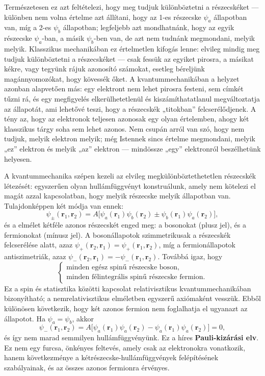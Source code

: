 \documentclass[../main.tex]{subfiles}
\begin{document}
Természetesen ez azt feltételezi, hogy meg tudjuk különböztetni a részecskéket — különben nem volna értelme azt állítani, hogy az 1-es részecske $\psi_a$ állapotban van, míg a 2-es $\psi_b$ állapotban; legfeljebb azt mondhatnánk, hogy az egyik részecske $\psi_a$-ban, a másik $\psi_b$-ben van, de azt nem tudnánk megmondani, melyik melyik. Klasszikus mechanikában ez értelmetlen kifogás lenne: elvileg mindig meg tudjuk különböztetni a részecskéket — csak fessük az egyiket pirosra, a másikat kékre, vagy tegyünk rájuk azonosító számokat, esetleg béreljünk magánnyomozókat, hogy kövessék őket. A kvantummechanikában a helyzet azonban alapvetően más: egy elektront nem lehet pirosra festeni, sem címkét tűzni rá, és egy megfigyelés elkerülhetetlenül és kiszámíthatatlanul megváltoztatja az állapotát, ami lehetővé teszi, hogy a részecskék „titokban” felcserélődjenek. A tény az, hogy az elektronok teljesen azonosak egy olyan értelemben, ahogy két klasszikus tárgy soha sem lehet azonos. Nem csupán arról van szó, hogy nem tudjuk, melyik elektron melyik; még Istennek sincs értelme megmondani, melyik „ez” elektron és melyik „az” elektron — mindössze „egy” elektronról beszélhetünk helyesen.

A kvantummechanika szépen kezeli az elvileg megkülönböztethetetlen részecskék létezését: egyszerűen olyan hullámfüggvényt konstruálunk, amely nem kötelezi el magát azzal kapcsolatban, hogy melyik részecske melyik állapotban van. Tulajdonképpen két módja van ennek:
\begin{equation}
\psi_{\pm}(\mathbf{r}_1,\mathbf{r}_2) = A\big[\psi_a(\mathbf{r}_1)\psi_b(\mathbf{r}_2)\pm\psi_b(\mathbf{r}_1)\psi_a(\mathbf{r}_2)\big],
\tag{5.17}
\end{equation}
és a elmélet kétféle azonos részecskét enged meg: a bosonokat (plusz jel), és a fermionokat (mínusz jel). A bosonállapotok szimmetrikusak a részecskék felcserélése alatt, azaz $\psi_+(\mathbf{r}_2,\mathbf{r}_1)=\psi_+(\mathbf{r}_1,\mathbf{r}_2)$, míg a fermionállapotok antiszimetriák, azaz $\psi_-(\mathbf{r}_2,\mathbf{r}_1)=-\psi_-(\mathbf{r}_1,\mathbf{r}_2)$. Továbbá igaz, hogy
\begin{equation}
\begin{cases}
\text{minden egész spinű részecske boson,}\\[4pt]
\text{minden félintegrális spinű részecske fermion.}
\end{cases}
\tag{5.18}
\end{equation}
Ez a spin és statisztika közötti kapcsolat relativisztikus kvantummechanikában bizonyítható; a nemrelativisztikus elméletben egyszerű axiómaként vesszük. Ebből különösen következik, hogy két azonos fermion nem foglalhatja el ugyanazt az állapotot. Ha $\psi_a=\psi_b$, akkor
\[
\psi_-(\mathbf{r}_1,\mathbf{r}_2)=A\big[\psi_a(\mathbf{r}_1)\psi_a(\mathbf{r}_2)-\psi_a(\mathbf{r}_1)\psi_a(\mathbf{r}_2)\big]=0,
\]
és így nem marad semmilyen hullámfüggvényünk. Ez a híres \textbf{Pauli‑kizárási elv}. Ez nem egy furcsa, önkényes feltevés, amely csak az elektronokra vonatkozik, hanem következménye a kétrészecske-hullámfüggvények felépítésének szabályainak, és az összes azonos fermionra érvényes.
\end{document}
